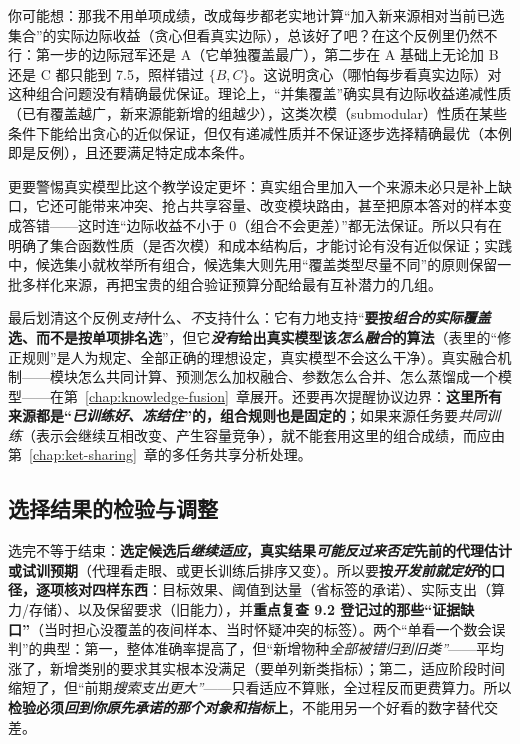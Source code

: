 你可能想：那我不用单项成绩，改成每步都老实地计算“加入新来源相对当前已选集合”的实际边际收益（贪心但看真实边际），总该好了吧？在这个反例里仍然不行：第一步的边际冠军还是 A（它单独覆盖最广），第二步在 A 基础上无论加 B 还是 C 都只能到 7.5，照样错过 $\{B,C\}$。这说明贪心（哪怕每步看真实边际）对这种组合问题没有精确最优保证。理论上，“并集覆盖”确实具有边际收益递减性质（已有覆盖越广，新来源能新增的组越少），这类次模（submodular）性质在某些条件下能给出贪心的近似保证，但仅有递减性质并不保证逐步选择精确最优（本例即是反例），且还要满足特定成本条件。

更要警惕真实模型比这个教学设定更坏：真实组合里加入一个来源未必只是补上缺口，它还可能带来冲突、抢占共享容量、改变模块路由，甚至把原本答对的样本变成答错——这时连“边际收益不小于 0（组合不会更差）”都无法保证。所以只有在明确了集合函数性质（是否次模）和成本结构后，才能讨论有没有近似保证；实践中，候选集小就枚举所有组合，候选集大则先用“覆盖类型尽量不同”的原则保留一批多样化来源，再把宝贵的组合验证预算分配给最有互补潜力的几组。

最后划清这个反例\emph{支持}什么、\emph{不}支持什么：它有力地支持“\textbf{要按\emph{组合的实际覆盖}选、而不是按单项排名选}”，但它\textbf{\emph{没有}给出真实模型该\emph{怎么融合}的算法}（表里的“修正规则”是人为规定、全部正确的理想设定，真实模型不会这么干净）。真实融合机制——模块怎么共同计算、预测怎么加权融合、参数怎么合并、怎么蒸馏成一个模型——在第~\ref{chap:knowledge-fusion}~章展开。还要再次提醒协议边界：\textbf{这里所有来源都是“\emph{已训练好、冻结住}”的，组合规则也是固定的}；如果来源任务要\emph{共同训练}（表示会继续互相改变、产生容量竞争），就不能套用这里的组合成绩，而应由第~\ref{chap:ket-sharing}~章的多任务共享分析处理。

\subsection{选择结果的检验与调整}
\label{sec:ket-reuse-validation}

选完不等于结束：\textbf{选定候选后\emph{继续适应}，真实结果\emph{可能反过来否定}先前的代理估计或试训预期}（代理看走眼、或更长训练后排序又变）。所以要\textbf{按\emph{开发前就定好}的口径，逐项核对四样东西}：目标效果、阈值到达量（省标签的承诺）、实际支出（算力/存储）、以及保留要求（旧能力），并\textbf{重点复查 9.2 登记过的那些“证据缺口”}（当时担心没覆盖的夜间样本、当时怀疑冲突的标签）。两个“单看一个数会误判”的典型：第一，整体准确率提高了，但“新增物种\emph{全部被错归到旧类”}——平均涨了，新增类别的要求其实根本没满足（要单列新类指标）；第二，适应阶段时间缩短了，但“前期\emph{搜索支出更大”}——只看适应不算账，全过程反而更费算力。所以\textbf{检验必须\emph{回到你\emph{原先承诺}的那个\emph{对象}和\emph{指标}}上}，不能用另一个好看的数字替代交差。

